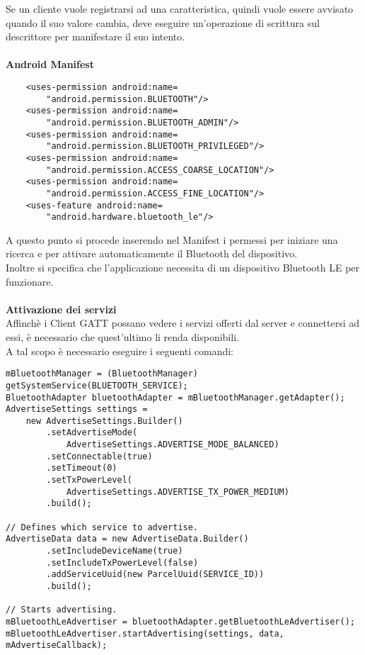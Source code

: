 \documentclass{article}
\begin{document}
Se un cliente vuole registrarsi ad una caratteristica, quindi vuole essere avvisato quando il suo valore cambia, deve eseguire un'operazione di scrittura sul descrittore per manifestare il suo intento. 
\\ \\ \textbf{Android Manifest} 
\begin{lstlisting}
    <uses-permission android:name=
        "android.permission.BLUETOOTH"/>
    <uses-permission android:name=
        "android.permission.BLUETOOTH_ADMIN"/>
    <uses-permission android:name=
        "android.permission.BLUETOOTH_PRIVILEGED"/>
    <uses-permission android:name=
        "android.permission.ACCESS_COARSE_LOCATION"/>
    <uses-permission android:name=
        "android.permission.ACCESS_FINE_LOCATION"/>
    <uses-feature android:name=
        "android.hardware.bluetooth_le"/>
\end{lstlisting}
A questo punto si procede inserendo nel Manifest i permessi per iniziare una ricerca e per attivare automaticamente il Bluetooth del dispositivo. \\
Inoltre si specifica che l'applicazione necessita di un dispositivo Bluetooth LE per funzionare.
\\ \\ \textbf{Attivazione dei servizi}\\ 
Affinchè i Client GATT possano vedere i servizi offerti dal server e connettersi ad essi, è necessario che quest'ultimo li renda disponibili.\\
A tal scopo è necessario eseguire i seguenti comandi:
\begin{lstlisting}
mBluetoothManager = (BluetoothManager) getSystemService(BLUETOOTH_SERVICE);
BluetoothAdapter bluetoothAdapter = mBluetoothManager.getAdapter();
AdvertiseSettings settings = 
    new AdvertiseSettings.Builder()
        .setAdvertiseMode(
            AdvertiseSettings.ADVERTISE_MODE_BALANCED)
        .setConnectable(true)
        .setTimeout(0)
        .setTxPowerLevel(
            AdvertiseSettings.ADVERTISE_TX_POWER_MEDIUM)
        .build();

// Defines which service to advertise.
AdvertiseData data = new AdvertiseData.Builder()
        .setIncludeDeviceName(true)
        .setIncludeTxPowerLevel(false)
        .addServiceUuid(new ParcelUuid(SERVICE_ID))
        .build();

// Starts advertising.
mBluetoothLeAdvertiser = bluetoothAdapter.getBluetoothLeAdvertiser();
mBluetoothLeAdvertiser.startAdvertising(settings, data, mAdvertiseCallback);
\end{lstlisting}
\end{document}
